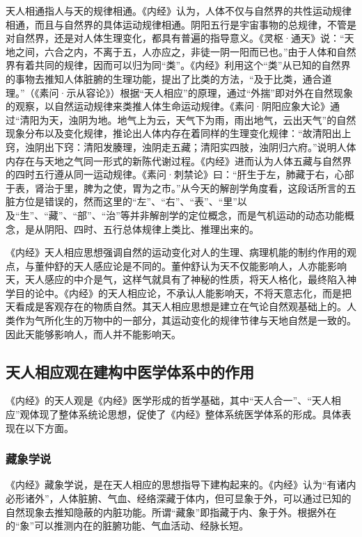 \documentclass[draft,12pt]{ctexbook}
\begin{document}
天人相通指人与天的规律相通。《内经》认为，人体不仅与自然界的共性运动规律相通，而且与自然界的具体运动规律相通。阴阳五行是宇宙事物的总规律，不管是对自然界，还是对人体生理变化，都具有普遍的指导意义。《灵枢·通天》说：“天地之间，六合之内，不离于五，人亦应之，非徒一阴一阳而已也。”由于人体和自然界有着共同的规律，因而可以归为同“类”。《内经》利用这个“类”从已知的自然界的事物去推知人体脏腑的生理功能，提出了比类的方法，“及于比类，通合道理。”（《素问·示从容论》）根据“天人相应”的原理，通过“外揣”即对外在自然现象的观察，以自然运动规律来类推人体生命运动规律。《素问·阴阳应象大论》通过“清阳为天，浊阴为地。地气上为云，天气下为雨，雨出地气，云出天气”的自然现象分布以及变化规律，推论出人体内存在着同样的生理变化规律：“故清阳出上窍，浊阴出下窍：清阳发腠理，浊阴走五藏；清阳实四肢，浊阴归六府。”说明人体内存在与天地之气同一形式的新陈代谢过程。《内经》进而认为人体五藏与自然界的四时五行遵从同一运动规律。《素问·刺禁论》曰：“肝生于左，肺藏于右，心部于表，肾治于里，脾为之使，胃为之市。”从今天的解剖学角度看，这段话所言的五脏方位是错误的，然而这里的“左”、“右”、“表”、“里”以及“生”、“藏”、“部”、“治”等并非解剖学的定位概念，而是气机运动的动态功能概念，是从阴阳、四时、五行总体规律上类比、推理出来的。

《内经》天人相应思想强调自然的运动变化对人的生理、病理机能的制约作用的观点，与董仲舒的天人感应论是不同的。董仲舒认为天不仅能影响人，人亦能影响天，天人感应的中介是气，这样气就具有了神秘的性质，将天人格化，最终陷入神学目的论中。《内经》的天人相应论，不承认人能影响天，不将天意志化，而是把天看成是客观存在的物质自然。其天人相应思想是建立在气论自然观基础上的。人类作为气所化生的万物中的一部分，其运动变化的规律节律与天地自然是一致的。因此天能够影响人，而人并不能影响天。

\subsection{天人相应观在建构中医学体系中的作用}%

《内经》的天人观是《内经》医学形成的哲学基础，其中“天人合一”、“天人相应”观体现了整体系统论思想，促使了《内经》整体系统医学体系的形成。具体表现在以下方面。

\subsubsection{藏象学说}%

《内经》藏象学说，是在天人相应的思想指导下建构起来的。《内经》认为“有诸内必形诸外”，人体脏腑、气血、经络深藏于体内，但可显象于外，可以通过已知的自然现象去推知隐蔽的内脏功能。所谓“藏象”即指藏于内、象于外。根据外在的“象”可以推测内在的脏腑功能、气血活动、经脉长短。
\end{document}
